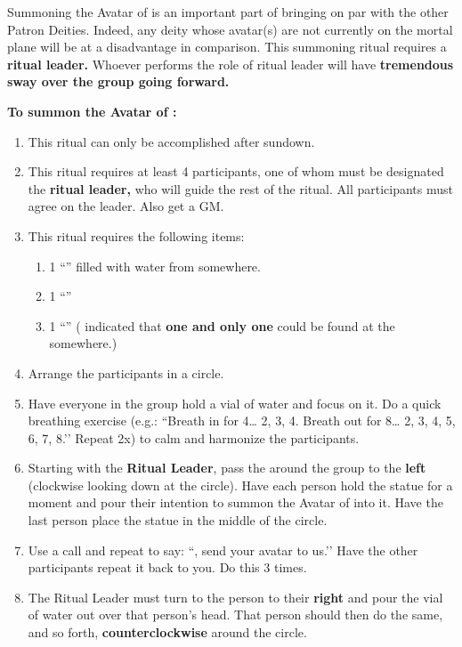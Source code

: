 \documentclass[green]{GL2020}
\begin{document}
\name{\gGenesisAvatar{}}

Summoning the Avatar of \cGenesis{} is an important part of bringing \cGenesis{} on par with the other Patron Deities. Indeed, any deity whose avatar(s) are not currently on the mortal plane will be at a disadvantage in comparison. This summoning ritual requires a \textbf{ritual leader.} Whoever performs the role of ritual leader will have \textbf{tremendous sway over the group going forward.}

\textbf{To summon the Avatar of \cGenesis{}:}
\begin{enumerate}
  \item This ritual can only be accomplished after sundown.
  \item This ritual requires at least 4 participants, one of whom must be designated the \textbf{ritual leader,} who will guide the rest of the ritual. All participants must agree on the leader. Also get a GM.
  \item This ritual requires the following items:
    \begin{enumerate}
      \item 1 ``\iGlassVial{}'' filled with water from somewhere.
      \item 1 ``\iStoneFlower{}''
      \item 1 ``\iRabbitStatue{}''  (\cGenesis{} indicated that \textbf{one and only one} could be found at the \pSchool{} somewhere.)
    \end{enumerate}
  \item Arrange the participants in a circle.
  \item Have everyone in the group hold a vial of water and focus on it. Do a quick breathing exercise (e.g.: ``Breath in for 4… 2, 3, 4. Breath out for 8… 2, 3, 4, 5, 6, 7, 8.’’ Repeat 2x) to calm and harmonize the participants.
  \item Starting with the \textbf{Ritual Leader}, pass the \iRabbitStatue{} around the group to the \textbf{left} (clockwise looking down at the circle). Have each person hold the statue for a moment and pour their intention to summon the Avatar of \cGenesis{} into it. Have the last person place the statue in the middle of the circle.
  \item Use a call and repeat to say: ``\cGenesis{}, send your avatar to us.’’ Have the other participants repeat it back to you. Do this 3 times.
  \item The Ritual Leader must turn to the person to their \textbf{right} and pour the vial of water out over that person’s head. That person should then do the same, and so forth, \textbf{counterclockwise} around the circle.

\end{enumerate}
\end{document}

